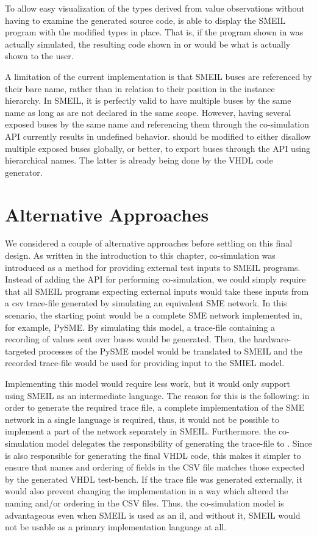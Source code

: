 To allow easy visualization of the types derived from value observations without
having to examine the generated source code, \libsme{} is able to display the
SMEIL program with the modified types in place. That is, if the program shown in
 was actually simulated, the resulting code shown in
 or  would be what is actually shown
to the user.

A limitation of the current implementation is that SMEIL buses are referenced by
their bare name, rather than in relation to their position in the instance
hierarchy. In SMEIL, it is perfectly valid to have multiple buses by the same
name as long as are not declared in the same scope. However, having several
{\ttfamily exposed} buses by the same name and referencing them through the
co-simulation API currently results in undefined behavior. \libsme{} should be
modified to either disallow multiple {\ttfamily exposed} buses globally, or
better, to export buses through the API using hierarchical names. The latter is
already being done by the VHDL code generator.

\section{Alternative Approaches}
We considered a couple of alternative approaches before settling on this final
design. As written in the introduction to this chapter, co-simulation was
introduced as a method for providing external test inputs to SMEIL programs.
Instead of adding the API for performing co-simulation, we could simply require
that all SMEIL programs expecting external inputs would take these inputs from a
\gls{csv} trace-file generated by simulating an equivalent SME network. In this
scenario, the starting point would be a complete SME network implemented in, for
example, PySME. By simulating this model, a trace-file containing a recording of
values sent over buses would be generated. Then, the hardware-targeted processes
of the PySME model would be translated to SMEIL and the recorded trace-file
would be used for providing input to the SMIEL model.

Implementing this model would require less
work, but it would only support using SMEIL as an intermediate language. The
reason for this is the following: in order to generate the required trace file,
a complete implementation of the SME network in a single language is required,
thus, it would not be possible to implement a part of the network separately in
SMEIL. Furthermore. the co-simulation model delegates the responsibility of
generating the trace-file to \libsme{}. Since \libsme{} is also responsible for
generating the final VHDL code, this makes it simpler to ensure that names and
ordering of fields in the CSV file matches those expected by the generated VHDL
test-bench. If the trace file was generated externally, it would also prevent
changing the \libsme{} implementation in a way which altered the naming and/or
ordering in the CSV files. Thus, the co-simulation model is advantageous even
when SMEIL is used as an \gls{il}, and without it, SMEIL would not be usable as
a primary implementation language at all.


